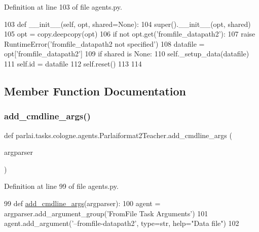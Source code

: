 Definition at line 103 of file agents.\+py.


\begin{DoxyCode}
103     \textcolor{keyword}{def }\_\_init\_\_(self, opt, shared=None):
104         super().\_\_init\_\_(opt, shared)
105         opt = copy.deepcopy(opt)
106         \textcolor{keywordflow}{if} \textcolor{keywordflow}{not} opt.get(\textcolor{stringliteral}{'fromfile\_datapath2'}):
107             \textcolor{keywordflow}{raise} RuntimeError(\textcolor{stringliteral}{'fromfile\_datapath2 not specified'})
108         datafile = opt[\textcolor{stringliteral}{'fromfile\_datapath2'}]
109         \textcolor{keywordflow}{if} shared \textcolor{keywordflow}{is} \textcolor{keywordtype}{None}:
110             self.\_setup\_data(datafile)
111         self.id = datafile
112         self.reset()
113 
114 
\end{DoxyCode}


\subsection{Member Function Documentation}
\mbox{\label{classparlai_1_1tasks_1_1cologne_1_1agents_1_1Parlaiformat2Teacher_a71d2157bd6c642aeb4f26f04c33941ed}} 
\subsubsection{\texorpdfstring{add\+\_\+cmdline\+\_\+args()}{add\_cmdline\_args()}}
{\footnotesize\ttfamily def parlai.\+tasks.\+cologne.\+agents.\+Parlaiformat2\+Teacher.\+add\+\_\+cmdline\+\_\+args (\begin{DoxyParamCaption}\item[{}]{argparser }\end{DoxyParamCaption})\hspace{0.3cm}{\ttfamily [static]}}



Definition at line 99 of file agents.\+py.


\begin{DoxyCode}
99     \textcolor{keyword}{def }\hyperlink{namespaceparlai_1_1agents_1_1drqa_1_1config_a62fdd5554f1da6be0cba185271058320}{add\_cmdline\_args}(argparser):
100         agent = argparser.add\_argument\_group(\textcolor{stringliteral}{'FromFile Task Arguments'})
101         agent.add\_argument(\textcolor{stringliteral}{'--fromfile-datapath2'}, type=str, help=\textcolor{stringliteral}{"Data file"})
102 
\end{DoxyCode}


